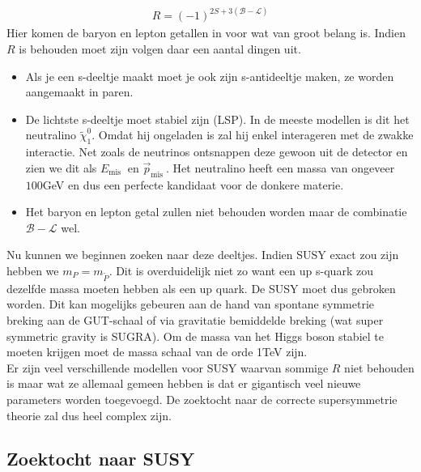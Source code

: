 \documentclass[../main.tex]{subfiles}
\begin{document}
\begin{equation}
    \begin{aligned}
        \label{eq:r_pariteit}
        R=(-1)^{2 S+3(\mathcal{B}-\mathcal{L})}
    \end{aligned}
\end{equation}
Hier komen de baryon en lepton getallen in voor wat van groot belang is. Indien $R$ is behouden moet zijn volgen daar een aantal dingen uit.
\begin{itemize}
    \item Als je een s-deeltje maakt moet je ook zijn s-antideeltje maken, ze worden aangemaakt in paren.
    \item De lichtste s-deeltje moet stabiel zijn (LSP). In de meeste modellen is dit het neutralino $\tilde{\chi}_{1}^{0}$. Omdat hij ongeladen is zal hij enkel interageren met de zwakke interactie. Net zoals de neutrinos ontsnappen deze gewoon uit de detector en zien we dit als $E_{\text {mis }}$ en $\vec{p}_{\text {mis }}$. Het neutralino heeft een massa van ongeveer $100$GeV en dus een perfecte kandidaat voor de donkere materie.
    \item Het baryon en lepton getal zullen niet behouden worden maar de combinatie $\mathcal{B}-\mathcal{L}$ wel.
\end{itemize}
Nu kunnen we beginnen zoeken naar deze deeltjes. Indien SUSY exact zou zijn hebben we $m_{P}=m_{\tilde{P}}$. Dit is overduidelijk niet zo want een up s-quark zou dezelfde massa moeten hebben als een up quark. De SUSY moet dus gebroken worden. Dit kan mogelijks gebeuren aan de hand van spontane symmetrie breking aan de GUT-schaal of via gravitatie bemiddelde breking (wat super symmetric gravity is SUGRA). Om de massa van het Higgs boson stabiel te moeten krijgen moet de massa schaal van de orde 1TeV zijn.\\
Er zijn veel verschillende modellen voor SUSY waarvan sommige $R$ niet behouden is maar wat ze allemaal gemeen hebben is dat er gigantisch veel nieuwe parameters worden toegevoegd. De zoektocht naar de correcte supersymmetrie theorie zal dus heel complex zijn.

\subsection{Zoektocht naar SUSY}%
\label{sub:zoektocht_naar_susy}
\end{document}
